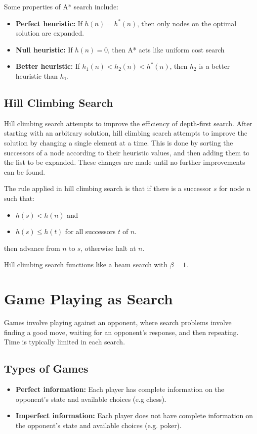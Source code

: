 \documentclass[12pt,titlepage]{article}
\begin{document}
      Some properties of A* search include:
      \begin{itemize}
        \item \textbf{Perfect heuristic:} If $h(n) = h^*(n)$, then only nodes on the optimal solution are expanded.
        \item \textbf{Null heuristic:} If $h(n) = 0$, then A* acts like uniform cost search
        \item \textbf{Better heuristic:} If $h_1(n) < h_2(n) < h^*(n)$, then $h_2$ is a better heuristic than $h_1$.
      \end{itemize}

    \subsection{Hill Climbing Search}
      Hill climbing search attempts to improve the efficiency of depth-first search. After starting with an arbitrary solution, hill climbing
      search attempts to improve the solution by changing a single element at a time. This is done by sorting the successors of a node according
      to their heuristic values, and then adding them to the list to be expanded. These changes are made until no further improvements can be found.

      The rule applied in hill climbing search is that if there is a successor $s$ for node $n$ such that:
      \begin{itemize}
        \item $h(s) < h(n)$ and
        \item $h(s) \leq h(t)$ for all successors $t$ of $n$.
      \end{itemize}
      then advance from $n$ to $s$, otherwise halt at $n$.

      Hill climbing search functions like a beam search with $\beta = 1$.

  \section{Game Playing as Search}
    Games involve playing against an opponent, where search problems involve finding a good move, waiting for an opponent's response, and then
    repeating. Time is typically limited in each search.

    \subsection{Types of Games}
      \begin{itemize}
        \item \textbf{Perfect information:} Each player has complete information on the opponent's state and available choices (e.g chess).
        \item \textbf{Imperfect information:} Each player does not have complete information on the opponent's state and available choices (e.g. poker).
      \end{itemize}
\end{document}
